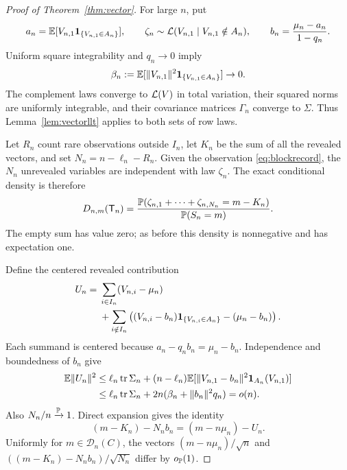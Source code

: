 \begin{proof}[Proof of Theorem~\ref{thm:vector}]
For large $n$, put
\[
 a_n=\mathbb E[V_{n,1}\mathbf 1_{\{V_{n,1}\in A_n\}}],\qquad
 \zeta_n\sim\mathcal L(V_{n,1}\mid V_{n,1}\notin A_n),\qquad
 b_n=\frac{\mu_n-a_n}{1-q_n}.
\]
Uniform square integrability and $q_n\to0$ imply
\begin{equation}\label{eq:vectorraresecond}
 \beta_n:=\mathbb E[\|V_{n,1}\|^2\mathbf 1_{\{V_{n,1}\in A_n\}}]\to0.
\end{equation}
The complement laws converge to $\mathcal L(V)$ in total variation, their squared norms are uniformly integrable, and their covariance matrices $\Gamma_n$ converge to $\Sigma$. Thus Lemma~\ref{lem:vectorllt} applies to both sets of row laws.

Let $R_n$ count rare observations outside $I_n$, let $K_n$ be the sum of all the revealed vectors, and set $N_n=n-\ell_n-R_n$. Given the observation \eqref{eq:blockrecord}, the $N_n$ unrevealed variables are independent with law $\zeta_n$. The exact conditional density is therefore
\begin{equation}\label{eq:vectordensity}
 D_{n,m}(\mathsf T_n)=
 \frac{\mathbb P(\zeta_{n,1}+\cdots+\zeta_{n,N_n}=m-K_n)}
      {\mathbb P(S_n=m)}.
\end{equation}
The empty sum has value zero; as before this density is nonnegative and has expectation one.

Define the centered revealed contribution
\begin{align}\label{eq:vectorU}
 U_n={}&\sum_{i\in I_n}(V_{n,i}-\mu_n)\\
 &+\sum_{i\notin I_n}
 \left((V_{n,i}-b_n)\mathbf 1_{\{V_{n,i}\in A_n\}}-(\mu_n-b_n)\right).\notag
\end{align}
Each summand is centered because $a_n-q_nb_n=\mu_n-b_n$. Independence and boundedness of $b_n$ give
\begin{align}\label{eq:vectorUbound}
 \mathbb E\|U_n\|^2
 &\le \ell_n\operatorname{tr}\Sigma_n
 +(n-\ell_n)\mathbb E[\|V_{n,1}-b_n\|^2\mathbf 1_{A_n}(V_{n,1})]\notag\\
 &\le \ell_n\operatorname{tr}\Sigma_n
       +2n(\beta_n+\|b_n\|^2q_n)=o(n).
\end{align}
Also $N_n/n\xrightarrow{\mathbb P}1$. Direct expansion gives the identity
\begin{equation}\label{eq:vectorcentering}
 (m-K_n)-N_nb_n=(m-n\mu_n)-U_n.
\end{equation}
Uniformly for $m\in\mathcal D_n(C)$, the vectors
$(m-n\mu_n)/\sqrt n$ and $((m-K_n)-N_nb_n)/\sqrt{N_n}$ differ by $o_{\mathbb P}(1)$.


\end{proof}
